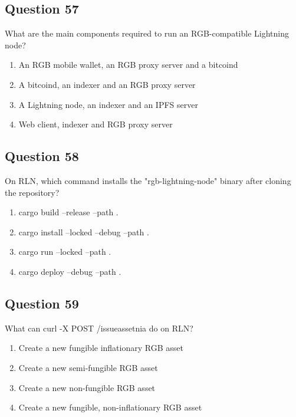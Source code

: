 \documentclass[12pt,a4paper]{article}
\begin{document}
\bigskip


\subsection*{Question 57}
What are the main components required to run an RGB-compatible Lightning node?

\begin{enumerate}[label=\Alph*., leftmargin=*]
\item An RGB mobile wallet, an RGB proxy server and a bitcoind
\item A bitcoind, an indexer and an RGB proxy server
\item A Lightning node, an indexer and an IPFS server
\item Web client, indexer and RGB proxy server
\end{enumerate}

\bigskip


\subsection*{Question 58}
On RLN, which command installs the "rgb-lightning-node" binary after cloning the repository?

\begin{enumerate}[label=\Alph*., leftmargin=*]
\item cargo build --release --path .
\item cargo install --locked --debug --path .
\item cargo run --locked --path .
\item cargo deploy --debug --path .
\end{enumerate}

\bigskip


\subsection*{Question 59}
What can curl -X POST /issueassetnia do on RLN?

\begin{enumerate}[label=\Alph*., leftmargin=*]
\item Create a new fungible inflationary RGB asset
\item Create a new semi-fungible RGB asset
\item Create a new non-fungible RGB asset
\item Create a new fungible, non-inflationary RGB asset
\end{enumerate}
\end{document}
